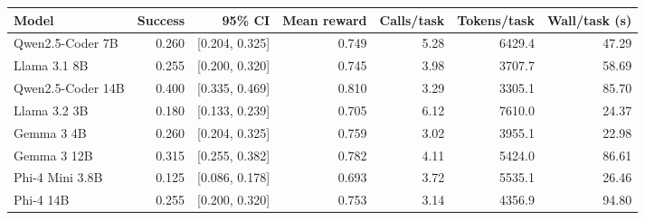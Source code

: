 \begin{tabular}{lrrrrrr}
\toprule
Model & Success & 95\% CI & Mean reward & Calls/task & Tokens/task & Wall/task (s) \\
\midrule
Qwen2.5-Coder 7B & 0.260 & [0.204, 0.325] & 0.749 & 5.28 & 6429.4 & 47.29 \\
Llama 3.1 8B & 0.255 & [0.200, 0.320] & 0.745 & 3.98 & 3707.7 & 58.69 \\
Qwen2.5-Coder 14B & 0.400 & [0.335, 0.469] & 0.810 & 3.29 & 3305.1 & 85.70 \\
Llama 3.2 3B & 0.180 & [0.133, 0.239] & 0.705 & 6.12 & 7610.0 & 24.37 \\
Gemma 3 4B & 0.260 & [0.204, 0.325] & 0.759 & 3.02 & 3955.1 & 22.98 \\
Gemma 3 12B & 0.315 & [0.255, 0.382] & 0.782 & 4.11 & 5424.0 & 86.61 \\
Phi-4 Mini 3.8B & 0.125 & [0.086, 0.178] & 0.693 & 3.72 & 5535.1 & 26.46 \\
Phi-4 14B & 0.255 & [0.200, 0.320] & 0.753 & 3.14 & 4356.9 & 94.80 \\
\bottomrule
\end{tabular}
